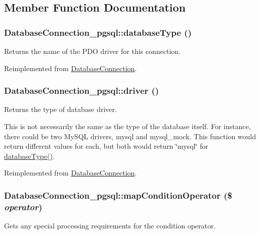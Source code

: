 \subsection{Member Function Documentation}
\hypertarget{classDatabaseConnection__pgsql_ad8e8147530abb85983d9cfdce5d0808c}{
\subsubsection[{databaseType}]{\setlength{\rightskip}{0pt plus 5cm}DatabaseConnection\_\-pgsql::databaseType ()}}
\label{classDatabaseConnection__pgsql_ad8e8147530abb85983d9cfdce5d0808c}
Returns the name of the PDO driver for this connection. 

Reimplemented from \hyperlink{classDatabaseConnection_a7dd7e76bc813c6a90a6d26a5529d67b0}{DatabaseConnection}.\hypertarget{classDatabaseConnection__pgsql_a60af8084115491a30ae1b6ee3552a958}{
\subsubsection[{driver}]{\setlength{\rightskip}{0pt plus 5cm}DatabaseConnection\_\-pgsql::driver ()}}
\label{classDatabaseConnection__pgsql_a60af8084115491a30ae1b6ee3552a958}
Returns the type of database driver.

This is not necessarily the same as the type of the database itself. For instance, there could be two MySQL drivers, mysql and mysql\_\-mock. This function would return different values for each, but both would return \char`\"{}mysql\char`\"{} for \hyperlink{classDatabaseConnection__pgsql_ad8e8147530abb85983d9cfdce5d0808c}{databaseType()}. 

Reimplemented from \hyperlink{classDatabaseConnection_a4a36a8d7352108c837c51a7172f966c3}{DatabaseConnection}.\hypertarget{classDatabaseConnection__pgsql_a71d8b6a2d7d97b3e194126abe714900f}{
\subsubsection[{mapConditionOperator}]{\setlength{\rightskip}{0pt plus 5cm}DatabaseConnection\_\-pgsql::mapConditionOperator (\$ {\em operator})}}
\label{classDatabaseConnection__pgsql_a71d8b6a2d7d97b3e194126abe714900f}
Gets any special processing requirements for the condition operator.

